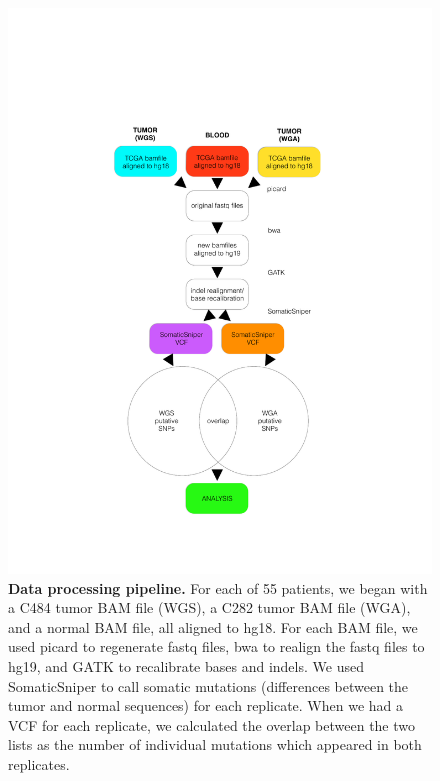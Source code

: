\documentclass[11pt]{article} %
\begin{document}
\begin{figure}
\centerline{
\includegraphics[width=5in]{figs1and2combo.pdf} }
\caption{\textbf{Data processing pipeline.} For each of 55 patients, we began with a C484 tumor BAM file (WGS), a C282 tumor BAM file (WGA), and a normal BAM file, all aligned to hg18. For each BAM file, we used picard to regenerate fastq files, bwa to realign the fastq files to hg19, and GATK to recalibrate bases and indels. We used SomaticSniper to call somatic mutations (differences between the tumor and normal sequences) for each replicate. When we had a VCF for each replicate, we calculated the overlap between the two lists as the number of individual mutations which appeared in both replicates.}
\label{fig:pipeline}
\end{figure}
\end{document}
